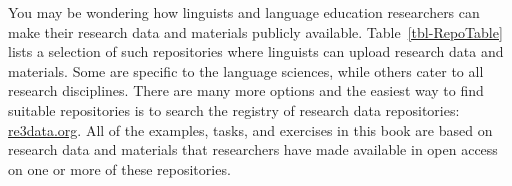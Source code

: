 \documentclass[
  letterpaper,
  DIV=11,
  numbers=noendperiod]{scrreprt}
\begin{document}
You may be wondering how linguists and language education researchers
can make their research data and materials publicly available.
Table~\ref{tbl-RepoTable} lists a selection of such repositories where
linguists can upload research data and materials. Some are specific to
the language sciences, while others cater to all research disciplines.
There are many more options and the easiest way to find suitable
repositories is to search the registry of research data repositories:
\href{https://www.re3data.org/}{re3data.org}. All of the examples,
tasks, and exercises in this book are based on research data and
materials that researchers have made available in open access on one or
more of these repositories.

\begin{table}

\caption{\label{tbl-RepoTable}Non-exhaustive list of public repositories
of research data and materials.}


\end{table}%
\end{document}
